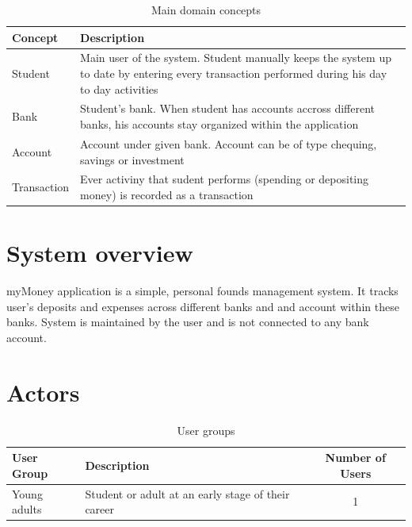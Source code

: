 \documentclass[12pt]{article}
\begin{document}
 
 
\begin{table}[H]
\caption{Main domain concepts}
\begin{center}
\begin{tabular}{|p{3cm}|p{14cm}|}
\hline
Concept & Description \\
\hline\hline
Student & Main user of the system. Student manually keeps the system up to date by entering every transaction performed during his day to day activities  \\
\hline
Bank & Student's bank. When student has accounts accross different banks, his accounts stay organized within the application \\
\hline
Account & Account under given bank. Account can be of type chequing, savings or investment\\
\hline
Transaction & Ever activiny that sudent performs (spending or depositing money) is recorded as a transaction \\
\hline
\end{tabular}
\end{center}
\end{table}

\section{System overview}


myMoney application is a simple, personal founds management system. It tracks user's deposits and expenses across different banks and and account within these banks. System is maintained by the user and is not connected to any bank account.

\section{Actors}

\begin{table}[H]
  \caption{User groups}
  \begin{center}
    \begin{tabular}{|l|p{8cm}|c|}
      \hline
      User Group & Description & Number of Users\\
      \hline\hline
      Young adults & Student or adult at an early stage of their career & 1\\
      \hline
    \end{tabular}
  \end{center}
\end{table}
\end{document}
